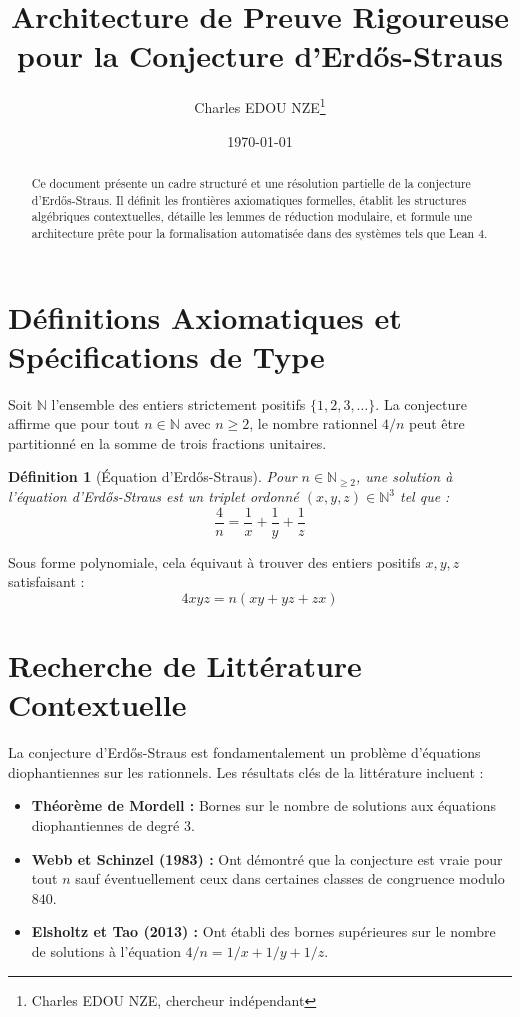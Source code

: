 \documentclass[12pt,a4paper]{article}
\title{Architecture de Preuve Rigoureuse pour la Conjecture d'Erd\H{o}s-Straus}
\author{Charles EDOU NZE\thanks{Charles EDOU NZE, chercheur ind\'ependant}}
\date{\today}
\newtheorem{definition}{D\'efinition}
\begin{document}
\maketitle

\begin{abstract}
Ce document pr\'esente un cadre structur\'e et une r\'esolution partielle de la conjecture d'Erd\H{o}s-Straus. Il d\'efinit les fronti\`eres axiomatiques formelles, \'etablit les structures alg\'ebriques contextuelles, d\'etaille les lemmes de r\'eduction modulaire, et formule une architecture pr\^ete pour la formalisation automatis\'ee dans des syst\`emes tels que Lean 4.
\end{abstract}

\tableofcontents
\newpage

\section{D\'efinitions Axiomatiques et Sp\'ecifications de Type}

Soit $\mathbb{N}$ l'ensemble des entiers strictement positifs $\{1, 2, 3, \ldots\}$. La conjecture affirme que pour tout $n \in \mathbb{N}$ avec $n \geq 2$, le nombre rationnel $4/n$ peut \^etre partitionn\'e en la somme de trois fractions unitaires.

\begin{definition}[Équation d'Erd\H{o}s-Straus]
Pour $n \in \mathbb{N}_{\geq 2}$, une solution \`a l'\'equation d'Erd\H{o}s-Straus est un triplet ordonn\'e $(x, y, z) \in \mathbb{N}^3$ tel que :
$$ \frac{4}{n} = \frac{1}{x} + \frac{1}{y} + \frac{1}{z} $$
\end{definition}

Sous forme polynomiale, cela \'equivaut \`a trouver des entiers positifs $x, y, z$ satisfaisant :
$$ 4xyz = n(xy + yz + zx) $$

\section{Recherche de Litt\'erature Contextuelle}

La conjecture d'Erd\H{o}s-Straus est fondamentalement un probl\`eme d'\'equations diophantiennes sur les rationnels. Les r\'esultats cl\'es de la litt\'erature incluent :
\begin{itemize}
    \item \textbf{Th\'eor\`eme de Mordell :} Bornes sur le nombre de solutions aux \'equations diophantiennes de degr\'e 3.
    \item \textbf{Webb et Schinzel (1983) :} Ont d\'emontr\'e que la conjecture est vraie pour tout $n$ sauf \'eventuellement ceux dans certaines classes de congruence modulo $840$.
    \item \textbf{Elsholtz et Tao (2013) :} Ont \'etabli des bornes sup\'erieures sur le nombre de solutions \`a l'\'equation $4/n = 1/x + 1/y + 1/z$.
\end{itemize}
\end{document}
